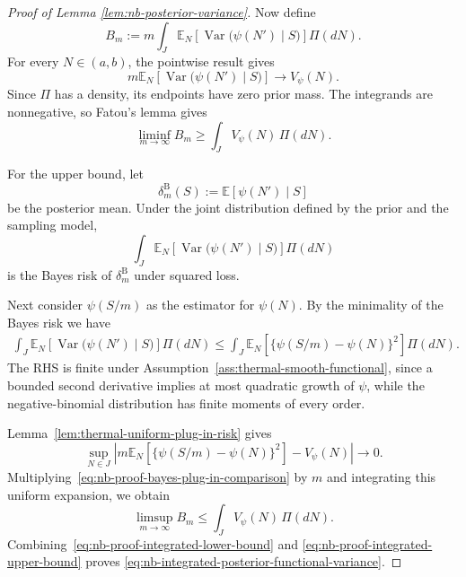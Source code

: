 \documentclass{article}
\theoremstyle{named}
\theoremstyle{named1}
\theoremstyle{plain}
\theoremstyle{remark}
\begin{document}
\begin{proof}[Proof of Lemma \ref{lem:nb-posterior-variance}]
Now define
\[
    B_m
    :=
    m\int_J
    \mathbb E_N
    \left[
        \operatorname{Var}\bigl(\psi(N')\mid S\bigr)
    \right]
    \Pi(dN).
\]
For every \(N\in(a,b)\), the pointwise result gives
\[
    m\mathbb E_N
    \left[
        \operatorname{Var}\bigl(\psi(N')\mid S\bigr)
    \right]
    \rightarrow
    V_\psi(N).
\]
Since \(\Pi\) has a density, its endpoints have zero prior mass.
The integrands are nonnegative, so Fatou's lemma gives
\begin{equation}
    \liminf_{m\to\infty}B_m
    \geq
    \int_J V_\psi(N)\,\Pi(dN).
    \label{eq:nb-proof-integrated-lower-bound}
\end{equation}

For the upper bound, let
\[
    \delta_m^{\mathrm B}(S)
    :=
    \mathbb E[\psi(N')\mid S]
\]
be the posterior mean. Under the joint distribution defined by the
prior and the sampling model,
\[
    \int_J
    \mathbb E_N
    \left[
        \operatorname{Var}\bigl(\psi(N')\mid S\bigr)
    \right]
    \Pi(dN)
\]
is the Bayes risk of \(\delta_m^{\mathrm B}\) under squared loss.


Next consider $\psi(S/m)$ as the estimator for $\psi(N)$. By the minimality of the Bayes risk we have 
\begin{align}
    \int_J
    \mathbb E_N
    \left[
        \operatorname{Var}\bigl(\psi(N')\mid S\bigr)
    \right]
    \Pi(dN)
    \leq
    \int_J
    \mathbb E_N
    \left[
        \{\psi(S/m)-\psi(N)\}^2
    \right]
    \Pi(dN).
    \label{eq:nb-proof-bayes-plug-in-comparison}
\end{align}
The RHS is finite
under Assumption~\ref{ass:thermal-smooth-functional}, since a bounded second derivative implies
at most quadratic growth of \(\psi\), while the negative-binomial
distribution has finite moments of every order.

Lemma~\ref{lem:thermal-uniform-plug-in-risk} gives
\[
    \sup_{N\in J}
    \left|
        m\mathbb E_N
        \left[
            \{\psi(S/m)-\psi(N)\}^2
        \right]
        -
        V_\psi(N)
    \right|
    \rightarrow0.
\]
Multiplying~\eqref{eq:nb-proof-bayes-plug-in-comparison} by \(m\)
and integrating this uniform expansion, we obtain
\begin{equation}
    \limsup_{m\to\infty}B_m
    \leq
    \int_J V_\psi(N)\,\Pi(dN).
    \label{eq:nb-proof-integrated-upper-bound}
\end{equation}
Combining~\eqref{eq:nb-proof-integrated-lower-bound} and
\eqref{eq:nb-proof-integrated-upper-bound} proves
\eqref{eq:nb-integrated-posterior-functional-variance}.


\end{proof}
\end{document}
